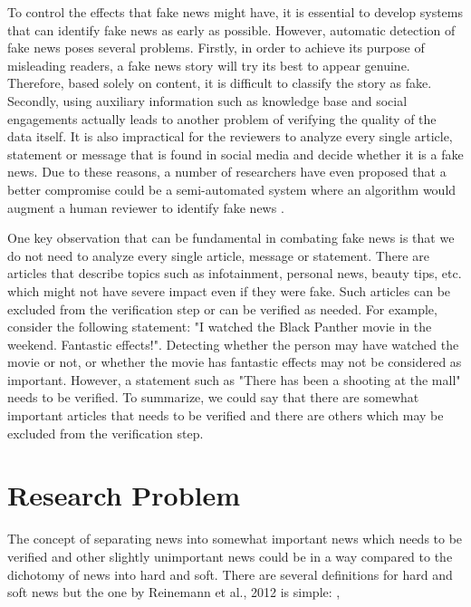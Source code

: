 To control the effects that fake news might have, it is essential to develop systems that can identify fake news as early as possible. However, automatic detection of fake news poses several problems. Firstly, in order to achieve its purpose of misleading readers, a fake news story will try its best to appear genuine. Therefore, based solely on content, it is difficult to classify the story as fake. Secondly, using auxiliary information such as knowledge base and social engagements actually leads to another problem of verifying the quality of the data itself\cite{shu2017fake}. It is also impractical for the reviewers to analyze every single article, statement or message that is found in social media and decide whether it is a fake news. Due to these reasons, a number of researchers have even proposed that a better compromise could be a semi-automated system where an algorithm would augment a human reviewer to identify fake news \cite{conroy2015automatic, chen2015news, wiegand2016veracity}.

One key observation that can be fundamental in combating fake news is that we do not need to analyze every single article, message or statement. There are articles that describe topics such as infotainment, personal news, beauty tips, etc. which might not have severe impact even if they were fake. Such articles can be excluded from the verification step or can be verified as needed. For example, consider the following statement: "I watched the Black Panther movie in the weekend. Fantastic effects!". Detecting whether the person may have watched the movie or not, or whether the movie has fantastic effects may not be considered as important. However, a statement such as "There has been a shooting at the mall" needs to be verified.
To summarize, we could say that there are somewhat important articles that needs to be verified and there are others which may be excluded from the verification step.

\section{Research Problem} \label{intro:research}
The concept of separating news into somewhat important news which needs to be verified and other slightly unimportant news could be in a way compared to the dichotomy of news into hard and soft. There are several definitions for hard and soft news \cite{reinemann2012hard, shoemaker2012news} but the one by Reinemann et al., 2012 is simple: \cite{reinemann2012hard},


